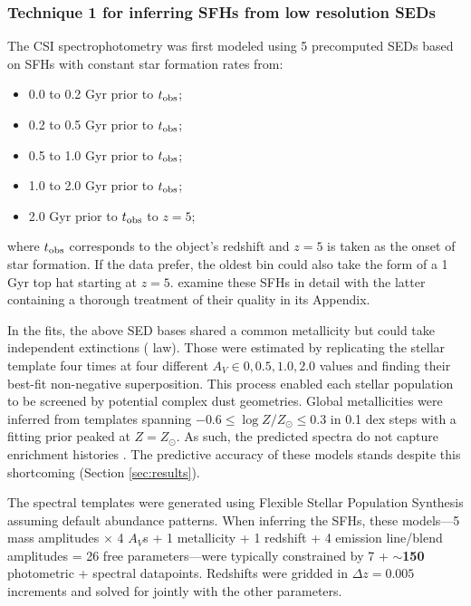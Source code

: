 \documentclass[a4paper,fleqn,usenatbib]{mnras}
\newcommand{\logZ}{\log Z/Z_{\odot}}
\newcommand{\bfr}{\bf\color{red}}
\newcommand{\tobs}{t_{\rm obs}}
\newcommand{\bitem}{\begin{itemize}}
\newcommand{\eitem}{\end{itemize}}
\begin{document}

\subsubsection{Technique 1 for inferring SFHs from low resolution SEDs}
\label{sec:blocks}

The CSI spectrophotometry was first modeled using 5 precomputed SEDs based on SFHs with 
constant star formation rates from:
\bitem
	\item 0.0 to 0.2 Gyr prior to $\tobs$;
	\item 0.2 to 0.5 Gyr prior to $\tobs$;
	\item 0.5 to 1.0 Gyr prior to $\tobs$;
	\item 1.0 to 2.0 Gyr prior to $\tobs$;
	\item 2.0 Gyr prior to $\tobs$ to $z=5$;
\eitem
where $\tobs$ corresponds to the object's redshift and $z=5$ is taken as the onset of star formation. If 
the data prefer, the oldest bin could also take the form of a 1 Gyr top hat starting at $z=5$. 
\citet{Dressler16, Dressler18} examine these SFHs in detail with the latter containing a thorough 
treatment of their quality in its Appendix.

In the fits, the above SED bases shared a common metallicity but could take independent extinctions 
(\citealt{Calzetti00} law). Those were estimated by replicating the stellar template four times
at four different {\bfr $A_{V}\in{0,0.5,1.0,2.0}$} values and finding their best-fit non-negative
superposition. This process enabled each stellar population to be screened by potential complex dust
geometries. Global metallicities were inferred from templates spanning 
$-0.6\leq\logZ\leq0.3$ in 0.1 dex steps with a fitting prior peaked at $Z=Z_{\odot}$. 
As such, the predicted spectra do not capture enrichment 
histories \citep[cf.][]{Pacifici12, Morishita19}. The predictive accuracy of these models stands despite 
this shortcoming (Section \ref{sec:results}).

The spectral templates were generated using Flexible Stellar Population Synthesis 
\citep[FSPS;][]{ConroyGunnWhite09} assuming default abundance patterns. When inferring the SFHs, 
these models---5 mass amplitudes $\times$ 4 $A_{V}$s + 1 metallicity + 1 redshift + 4 emission line/blend 
amplitudes = 26 free parameters---were typically constrained by 
7 + {\bfr $\sim$150} photometric + spectral datapoints. Redshifts were gridded in $\Delta z = 0.005$ 
increments and solved for jointly with the other parameters.
\end{document}

